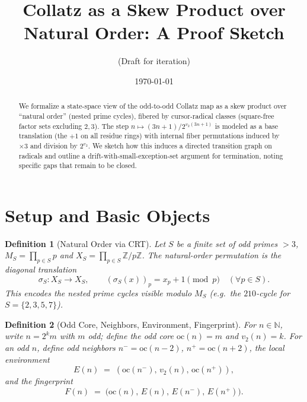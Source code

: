 \documentclass[11pt]{article}
\title{Collatz as a Skew Product over Natural Order: A Proof Sketch}
\author{(Draft for iteration)}
\date{\today}
\newtheorem{definition}{Definition}
\begin{document}
\maketitle

\begin{abstract}
We formalize a state-space view of the odd-to-odd Collatz map as a skew product over ``natural order'' (nested prime cycles), fibered by cursor-radical classes (square-free factor sets excluding $2,3$). The step $n\mapsto (3n+1)/2^{v_2(3n+1)}$ is modeled as a base translation (the $+1$ on all residue rings) with internal fiber permutations induced by $\times 3$ and division by $2^{v_2}$. We sketch how this induces a directed transition graph on radicals and outline a drift-with-small-exception-set argument for termination, noting specific gaps that remain to be closed.
\end{abstract}

\section{Setup and Basic Objects}

\begin{definition}[Natural Order via CRT]
Let $S$ be a finite set of odd primes $>3$, $M_S=\prod_{p\in S}p$ and $X_S=\prod_{p\in S}\mathbb Z/p\mathbb Z$. 
The \emph{natural-order permutation} is the diagonal translation
\[
  \sigma_S:X_S\to X_S,\qquad (\sigma_S(x))_p = x_p+1 \pmod p\quad(\forall p\in S).
\]
This encodes the nested prime cycles visible modulo $M_S$ (e.g.\ the $210$-cycle for $S=\{2,3,5,7\}$).\;%
\end{definition}

\begin{definition}[Odd Core, Neighbors, Environment, Fingerprint]
For $n\in\mathbb N$, write $n=2^k m$ with $m$ odd; define the \emph{odd core} $\mathrm{oc}(n)=m$ and $v_2(n)=k$.
For an odd $n$, define odd neighbors $n^-=\mathrm{oc}(n-2)$, $n^+=\mathrm{oc}(n+2)$, the \emph{local environment}
\[
E(n) \;=\;(\mathrm{oc}(n^-),\,v_2(n),\,\mathrm{oc}(n^+)),
\]
and the \emph{fingerprint}
\[
F(n)\;=\;\big(\mathrm{oc}(n),\,E(n),\,E(n^-),\,E(n^+)\big).
\]
\end{definition}
\end{document}
